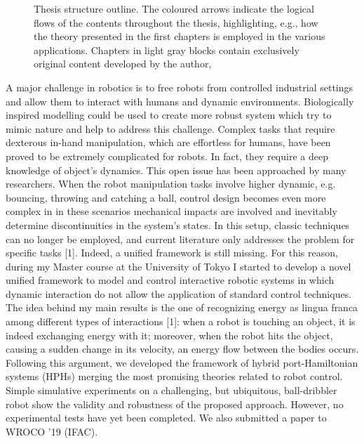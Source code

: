 \begin{figure}[b]
    \centering
    
    \vspace{5mm}
    \caption{Thesis structure outline. The coloured arrows indicate the logical flows of the contents throughout the thesis, highlighting, e.g., how the theory presented in the first chapters is employed in the various applications. Chapters in light gray blocks contain exclusively original content developed by the author,}
    \label{fig:ThesisStructure}
\end{figure}
\clearpage
\iffalse
A major challenge in robotics is to free robots from controlled industrial settings and allow them to interact with humans and dynamic environments. Biologically inspired modelling could be used to create more robust system which try to mimic nature and help to address this challenge. Complex tasks that require dexterous in-hand manipulation, which are effortless for humans, have been proved to be extremely complicated for robots. In fact, they require a deep knowledge of object’s dynamics. This open issue has been approached by many researchers. When the robot manipulation tasks involve higher dynamic, e.g. bouncing, throwing and catching a ball, control design becomes even more complex in in these scenarios mechanical impacts are involved and inevitably determine discontinuities in the system’s states. In this setup, classic techniques can no longer be employed, and current literature only addresses the problem for specific tasks [1]. Indeed, a unified framework is still missing. For this reason, during my Master course at the University of Tokyo I started to develop a novel unified framework to model and control interactive robotic systems in which dynamic interaction do not allow the application of standard control techniques. The idea behind my main results is the one of recognizing energy as lingua franca among different types of interactions [1]: when a robot is touching an object, it is indeed exchanging energy with it; moreover, when the robot hits the object, causing a sudden change in its velocity, an energy flow between the bodies occurs. Following this argument, we developed the framework of hybrid port-Hamiltonian systems (HPHs) merging the most promising theories related to robot control. Simple simulative experiments on a challenging, but ubiquitous, ball-dribbler robot show the validity and robustness of the proposed approach. However, no experimental tests have yet been completed. We also submitted a paper to WROCO ’19 (IFAC).
